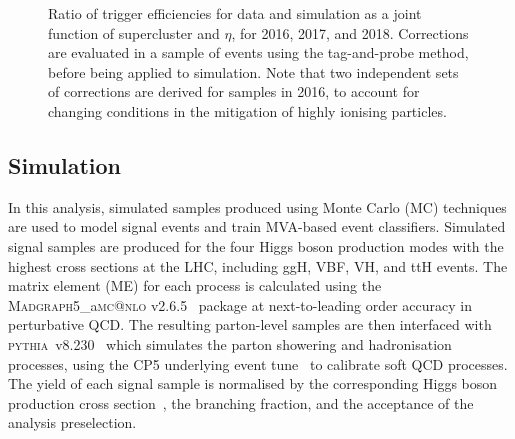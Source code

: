 \begin{figure}[htbp!]
\caption[Trigger efficiencies for data and simulated samples.]{Ratio of trigger efficiencies for data and simulation as a joint function of supercluster \pt and $\eta$, for 2016, 2017, and 2018. Corrections are evaluated in a sample of \Zee events using the tag-and-probe method, before being applied to simulation. Note that two independent sets of corrections are derived for samples in 2016, to account for changing conditions in the mitigation of highly ionising particles.}
\label{fig:hee_trigger_sfs}                                 
\end{figure} 

\subsection{Simulation}

In this analysis, simulated samples produced using Monte Carlo (MC) techniques are used to model signal events and train MVA-based event classifiers. Simulated signal samples are produced for the four Higgs boson production modes with the highest cross sections at the LHC, including ggH, VBF, VH, and ttH events. The matrix element (ME) for each process is calculated using the \textsc{Madgraph5\_}a\textsc{mc@nlo} v2.6.5~\cite{madgraph5} package at next-to-leading order accuracy in perturbative QCD. The resulting parton-level samples are then interfaced with \textsc{pythia}~v8.230~\cite{pythia8} which simulates the parton showering and hadronisation processes, using the CP5 underlying event tune~\cite{CP5Tune} to calibrate soft QCD processes. %
The yield of each signal sample is normalised by the corresponding Higgs boson production cross section~\cite{YR4}, the \Hee branching fraction, and the acceptance of the analysis preselection.

